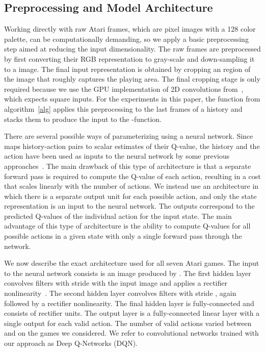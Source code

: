 \documentclass{article} \usepackage{nips13submit_e,times}
\begin{document}
\subsection{Preprocessing and Model Architecture}

Working directly with raw Atari frames, which are  pixel images with a 128 color palette, can be computationally demanding, so we apply a basic preprocessing step aimed at reducing the input dimensionality.  The raw frames are preprocessed by first converting their RGB representation to gray-scale and down-sampling it to a  image. The final input representation is obtained by cropping an  region of the image that roughly captures the playing area. The final cropping stage is only required because we use the GPU implementation of 2D convolutions from~\cite{krizhevsky-imagenet}, which expects square inputs.  For the experiments in this paper, the function  from algorithm~\ref{alg} applies this preprocessing to the last  frames of a history and stacks them to produce the input to the -function. 

There are several possible ways of parameterizing  using a neural network.  Since  maps history-action pairs to scalar estimates of their Q-value, the history and the action have been used as inputs to the neural network by some previous approaches~\cite{riedmiller-nfq,lange:dfq}.  The main drawback of this type of architecture is that a separate forward pass is required to compute the Q-value of each action, resulting in a cost that scales linearly with the number of actions.  We instead use an architecture in which there is a separate output unit for each possible action, and only the state representation is an input to the neural network.  The outputs correspond to the predicted Q-values of the individual action for the input state.  The main advantage of this type of architecture is the ability to compute Q-values for all possible actions in a given state with only a single forward pass through the network. 

We now describe the exact architecture used for all seven Atari games.
The input to the neural network consists is an  image produced by .  The first hidden layer convolves   filters with stride  with the input image and applies a rectifier nonlinearity~\cite{jarrett-best,nair-relu}.  The second hidden layer convolves   filters with stride , again followed by a rectifier nonlinearity.  The final hidden layer is fully-connected and consists of  rectifier units.  The output layer is a fully-connected linear layer with a single output for each valid action.  The number of valid actions varied between  and  on the games we considered.  We refer to convolutional networks trained with our approach as Deep Q-Networks (DQN). 
\end{document}
